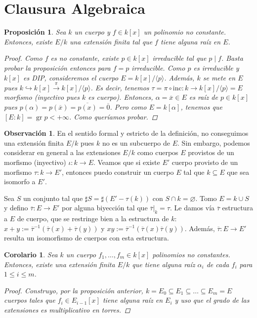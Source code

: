 \documentclass[12pt]{book}
\newtheorem{prop}[teo]{Proposición}
\newtheorem{cor}[teo]{Corolario}
\theoremstyle{definition}
\newtheorem{obs}[teo]{Observación}
\let\emptyset\varnothing
\DeclareMathOperator{\gr}{gr}
\begin{document}
\section{Clausura Algebraica}

\begin{prop}
Sea $k$ un cuerpo y $f\in k[x]$ un polinomio no constante. Entonces, existe $E/k$ una extensión finita tal que $f$ tiene alguna raíz en $E$.
\begin{proof}
Como $f$ es no constante, existe $p\in k[x]$ irreducible tal que $p\mid f$. Basta probar la proposición entonces para $f=p$ irreducible. Como $p$ es irreducible y $k[x]$ es DIP, consideremos el cuerpo $E=k[x]/\langle p\rangle$. Además, $k$ se mete en $E$ pues $k\hookrightarrow k[x]\stackrel{\pi}{\longrightarrow} k[x]/\langle p\rangle$. Es decir, tenemos $\tau = \pi\circ\mathrm{inc}:k\to k[x]/\langle p\rangle =E$ morfismo (inyectivo pues $k$ es cuerpo). Entonces, $\alpha=\overline{x}\in E$ es raíz de $p\in k[x]$ pues $p(\alpha)=p(\overline{x}) = \overline{p(x)}=\overline{0}$. Pero como $E=k[\alpha]$, tenemos que $[E:k]=\gr p < +\infty$. Como queríamos probar.
\end{proof}
\end{prop}

\begin{obs}
En el sentido formal y estricto de la definición, no conseguimos una extensión finita $E/k$ pues $k$ no es un subcuerpo de $E$. Sin embargo, podemos considerar en general a las extensiones $E/k$ como cuerpos $E$ provistos de un morfismo (inyectivo) $\iota:k\to E$. Veamos que si existe $E'$ cuerpo provisto de un morfismo $\tau:k\to E'$, entonces puedo construir un cuerpo $E$ tal que $k\subseteq E$ que sea isomorfo a $E'$.

Sea $S$ un conjunto tal que $\sharp S = \sharp (E'-\tau(k))$ con $S\cap k=\emptyset$. Tomo $E=k\cup S$ y defino $\overline{\tau}:E\to E'$ por alguna biyección tal que $\left.\overline{\tau}\right|_{k} = \tau$. Le damos vía $\overline{\tau}$ estructura a $E$ de cuerpo, que se restringe bien a la estructura de $k$: $x+y := \overline{\tau}^{-1}(\overline{\tau}(x)+\overline{\tau}(y))$ y $xy:=\overline{\tau}^{-1}(\overline{\tau}(x)\overline{\tau}(y))$. Además, $\overline{\tau}:E\to E'$ resulta un isomorfismo de cuerpos con esta estructura.

\end{obs}

\begin{cor}
Sea $k$ un cuerpo $f_1,\ldots ,f_m\in k[x]$ polinomios no constantes. Entonces, existe una extensión finita $E/k$ que tiene alguna raíz $\alpha_i$ de cada $f_i$ para $1\leq i\leq m$.
\begin{proof}
Construyo, por la proposición anterior, $k=E_0 \subseteq E_1\subseteq \ldots \subseteq E_m = E$ cuerpos tales que $f_i\in E_{i-1}[x]$ tiene alguna raíz en $E_i$ y uso que el grado de las extensiones es multiplicativo en torres.
\end{proof}
\end{cor}
\end{document}
